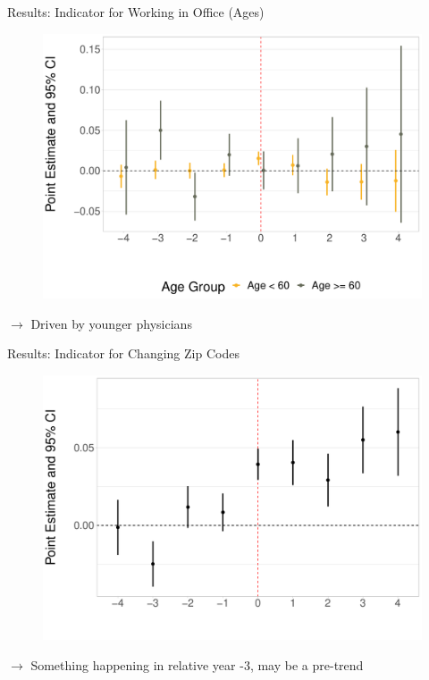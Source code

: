 \documentclass[10pt]{beamer}
\begin{document}
\begin{frame}{Results: Indicator for Working in Office (Ages)}
\begin{figure}[ht]
    \centering
    \includegraphics[scale=.35]{Objects/Presentation_office_ages.pdf}
\end{figure}
$\rightarrow$ Driven by younger physicians
\end{frame}

\begin{frame}{Results: Indicator for Changing Zip Codes}
\begin{figure}[ht]
    \centering
    \includegraphics[scale=.35]{Objects/Presentation_zip_all.pdf}
\end{figure}
$\rightarrow$ Something happening in relative year -3, may be a pre-trend
\end{frame}
\end{document}
